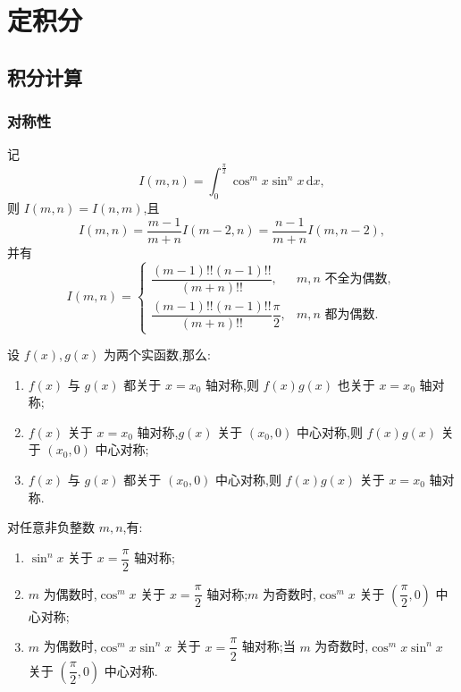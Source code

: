 \documentclass[../数学分析培优讲义.tex]{subfiles}
\begin{document}
\setcounter{chapter}{5}
\pagestyle{fancy}

\chapter{定积分}


\section{积分计算}


\subsection{对称性}

\begin{proposition}[\marktwostar]
记
\[
    I(m,n)=\int_0^{\frac{\pi}{2}}\cos^m x\sin^n x\,\mathrm{d}x,
\]
则 $I(m,n)=I(n,m)$,且
\[
    I(m,n)=\dfrac{m-1}{m+n}I(m-2,n)
    =\dfrac{n-1}{m+n}I(m,n-2),
\]
并有
\[
I(m,n)=
\begin{cases}
\dfrac{(m-1)!!(n-1)!!}{(m+n)!!},&m,n\text{ 不全为偶数},\\[6pt]
\dfrac{(m-1)!!(n-1)!!}{(m+n)!!}\dfrac{\pi}{2},&m,n\text{ 都为偶数}.
\end{cases}
\]
\end{proposition}

\begin{theorem}[\markstar]
设 $f(x),g(x)$ 为两个实函数,那么:
\begin{enumerate}[label=(\arabic*)]
    \item $f(x)$ 与 $g(x)$ 都关于 $x=x_0$ 轴对称,则 $f(x)g(x)$ 也关于 $x=x_0$ 轴对称;
    \item $f(x)$ 关于 $x=x_0$ 轴对称,$g(x)$ 关于 $(x_0,0)$ 中心对称,则 $f(x)g(x)$ 关于 $(x_0,0)$ 中心对称;
    \item $f(x)$ 与 $g(x)$ 都关于 $(x_0,0)$ 中心对称,则 $f(x)g(x)$ 关于 $x=x_0$ 轴对称.
\end{enumerate}
\end{theorem}

\begin{corollary}[\markstar]
对任意非负整数 $m,n$,有:
\begin{enumerate}[label=(\arabic*)]
    \item $\sin^n x$ 关于 $x=\dfrac{\pi}{2}$ 轴对称;
    \item $m$ 为偶数时,$\cos^m x$ 关于 $x=\dfrac{\pi}{2}$ 轴对称;$m$ 为奇数时,$\cos^m x$ 关于 $\left(\dfrac{\pi}{2},0\right)$ 中心对称;
    \item $m$ 为偶数时,$\cos^m x\sin^n x$ 关于 $x=\dfrac{\pi}{2}$ 轴对称;当 $m$ 为奇数时,$\cos^m x\sin^n x$ 关于 $\left(\dfrac{\pi}{2},0\right)$ 中心对称.
\end{enumerate}
\end{corollary}
\end{document}
